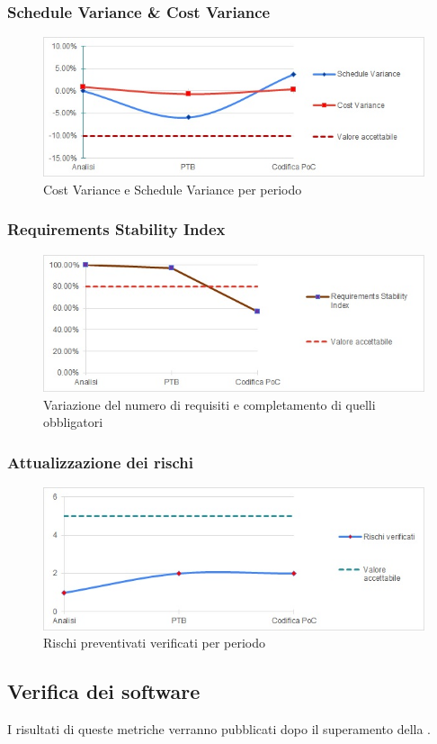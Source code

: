 \subsubsection{Schedule Variance \& Cost Variance}
\begin{figure}[H]
  \centering
  \includegraphics[scale=0.8]{immagini/sv_cv.jpg}
  \caption{Cost Variance e Schedule Variance per periodo}
\end{figure}

\subsubsection{Requirements Stability Index}
\begin{figure}[H]
  \centering
  \includegraphics[scale=0.8]{immagini/rsi.jpg}
  \caption{Variazione del numero di requisiti e completamento di quelli obbligatori}
\end{figure}

\subsubsection{Attualizzazione dei rischi}
\begin{figure}[H]
  \centering
  \includegraphics[scale=0.8]{immagini/rischi.jpg}
  \caption{Rischi preventivati verificati per periodo}
\end{figure}


\subsection{Verifica dei software}\label{subsection:verifica_software}
I risultati di queste metriche verranno pubblicati dopo il superamento della \RTB{}.